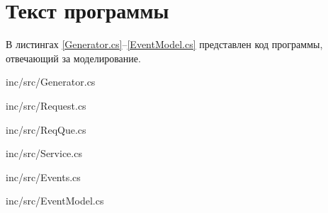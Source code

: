 \chapter{Текст программы}
В листингах \ref{Generator.cs}--\ref{EventModel.cs} представлен код программы, отвечающий за моделирование.

\begin{lstinputlisting}[
	caption={Код генератора},
	label={Generator.cs},
	language={[Sharp]C}
	]{inc/src/Generator.cs}
\end{lstinputlisting}

\newpage
\begin{lstinputlisting}[
	caption={Код заявки},
	label={Request.cs},
	language={[Sharp]C}
	]{inc/src/Request.cs}
\end{lstinputlisting}

\begin{lstinputlisting}[
	caption={Код очереди заявок},
	label={ReqQue.cs},
	language={[Sharp]C}
	]{inc/src/ReqQue.cs}
\end{lstinputlisting}

\newpage

\begin{lstinputlisting}[
	caption={Код обслуживающего аппарата},
	label={Service.cs},
	language={[Sharp]C}
	]{inc/src/Service.cs}
\end{lstinputlisting}


\newpage
\begin{lstinputlisting}[
	caption={Код событий},
	label={Events.cs},
	language={[Sharp]C}
	]{inc/src/Events.cs}
\end{lstinputlisting}

\newpage
\begin{lstinputlisting}[
	caption={Код событийной модели},
	label={EventModel.cs},
	language={[Sharp]C}
	]{inc/src/EventModel.cs}
\end{lstinputlisting}